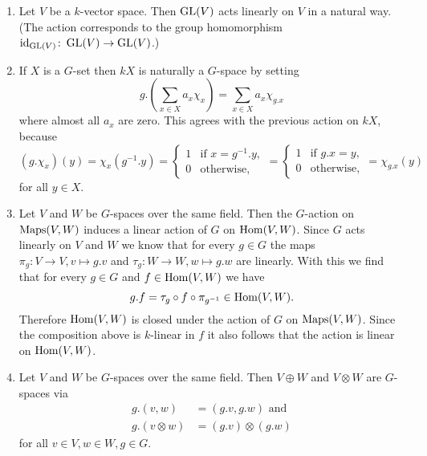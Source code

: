 \begin{expls}
 \begin{enumerate}[label=\emph{\alph*})]
  \item
   Let $V$ be a $k$-vector space. Then $\operatorname{GL}(V)$ acts linearly on $V$ in a natural way. (The action corresponds to the group homomorphism $\operatorname{id}_{\operatorname{GL}(V)} \colon \operatorname{GL}(V) \to \operatorname{GL}(V)$.)
  \item
   If $X$ is a $G$-set then $kX$ is naturally a $G$-space by setting
   \[
    g.\left(\sum_{x \in X} a_x \chi_x\right) = \sum_{x \in X} a_x \chi_{g.x}
   \]
   where almost all $a_x$ are zero. This agrees with the previous action on $kX$, because
   \[
    (g.\chi_x)(y)
    = \chi_x(g^{-1}.y)
    = \begin{cases} 1 & \text{if } x = g^{-1}.y, \\ 0 & \text{otherwise}, \end{cases}
    = \begin{cases} 1 & \text{if } g.x = y, \\ 0 & \text{otherwise}, \end{cases}
    = \chi_{g.x}(y)
   \]
   for all $y \in X$.
  \item
   Let $V$ and $W$ be $G$-spaces over the same field. Then the $G$-action on $\operatorname{Maps}(V,W)$ induces a linear action of $G$ on $\operatorname{Hom}(V,W)$. Since $G$ acts linearly on $V$ and $W$ we know that for every $g \in G$ the maps $\pi_g \colon V \to V, v \mapsto g.v$ and $\tau_g \colon W \to W, w \mapsto g.w$ are linearly. With this we find that for every $g \in G$ and $f \in \operatorname{Hom}(V,W)$ we have
   \[
    g.f = \tau_g \circ f \circ \pi_{g^{-1}} \in \operatorname{Hom}(V,W).
   \]
   Therefore $\operatorname{Hom}(V,W)$ is closed under the action of $G$ on $\operatorname{Maps}(V,W)$. Since the composition above is $k$-linear in $f$ it also follows that the action is linear on $\operatorname{Hom}(V,W)$.
  \item
   Let $V$ and $W$ be $G$-spaces over the same field. Then $V \oplus W$ and $V \otimes W$ are $G$-spaces via
   \begin{align*}
    g.(v,w) &= (g.v,g.w) \text{ and }  \tag{1} \\
    g.(v \otimes w) &= (g.v) \otimes (g.w) \tag{2}
   \end{align*}
   for all $v \in V, w \in W, g \in G$.
 \end{enumerate}
 

\end{expls}

